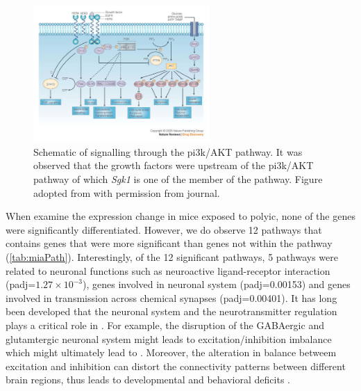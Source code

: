 \begin{figure}
	\centering
	\includegraphics[width=0.6\textwidth]{figure/omega/pi3ksignaling.jpg}
	\caption[Schematic of signalling through the PI3K/AKT pathway]{
		Schematic of signalling through the \gls{pi3k}/AKT pathway.
		It was observed that the growth factors were upstream of the \gls{pi3k}/AKT pathway of which \textit{Sgk1} is one of the member of the pathway.
		Figure adopted from \citet{Hennessy2005} with permission from journal.
	}\label{fig:pi3kPathway}
\end{figure}
When examine the expression change in mice exposed to \gls{polyic}, none of the genes were significantly differentiated. 
However, we do observe 12 pathways that contains genes that were more significant than genes not within the pathway (\cref{tab:miaPath}).
Interestingly, of the 12 significant pathways, 5 pathways were related to neuronal functions such as neuroactive ligand-receptor interaction (padj=$1.27\times 10^{-3}$), genes involved in neuronal system (padj=0.00153) and genes involved in transmission across chemical synapses (padj=0.00401).
It has long been developed that the neuronal system and the neurotransmitter regulation plays a critical role in .
For example, the disruption of the GABAergic and glutamtergic neuronal system might leads to excitation/inhibition imbalance which might ultimately lead to  \citep{Wassef2003}.
Moreover, the alteration in balance betweem excitation and inhibition can distort the connectivity patterns between different brain regions, thus leads to developmental and behavioral deficits \citep{Cline2005}.

